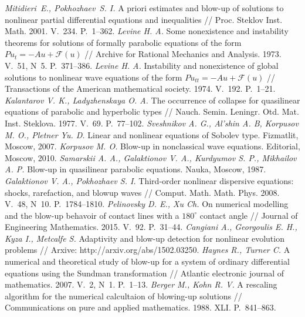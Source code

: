 \documentclass[twoside]{book}
\begin{document}
\begin{CJK*}{GBK}{song}


\begin{thebibliography}{s2}
      {\itshape Mitidieri~E., Pokhozhaev~S. I.} A priori estimates and blow-up of solutions to nonlinear partial differential equations and inequalities // Proc. Steklov Inst. Math. 2001. V.~234. P.~1--362.
     {\itshape Levine H. A.} Some nonexistence and instability theorems for solutions of formally parabolic equations of the form $Pu_t=-Au+\mathcal{F}(u)$ // Archive for Rational Mechanics and Analysis. 1973. V.~51, N~5. P.~371--386.
     {\itshape Levine H. A.}  Instability and nonexistence of global solutions to nonlinear wave equations of the form $Pu_{tt}=-Au+\mathcal{F}(u)$ // Transactions of the American mathematical society. 1974. V.~192. P.~1--21.
     {\itshape Kalantarov V. K., Ladyzhenskaya O. A.} The occurrence of collapse for quasilinear equations of parabolic and hyperbolic types // Nauch. Semin. Leningr. Otd. Mat. Inst. Steklova. 1977. V.~69. P.~77--102.
     {\itshape Sveshnikov A. G., Al’shin A. B, Korpusov M. O., Pletner Yu. D.}  Linear and nonlinear equations of Sobolev type.  Fizmatlit, Moscow, 2007.
     {\itshape Korpusov M. O.} Blow-up in nonclassical wave equations. Editorial, Moscow, 2010.
     {\itshape Samarskii A. A., Galaktionov V. A., Kurdyumov S. P., Mikhailov A. P.} Blow-up in quasilinear parabolic equations. Nauka, Moscow, 1987.
     {\itshape Galaktionov V. A., Pokhozhaev S. I.} Third-order nonlinear dispersive equations: shocks, rarefaction, and blowup waves // Comput. Math. Math. Phys. 2008. V.~48, N~10. P.~1784--1810.
     {\itshape Pelinovsky D. E., Xu Ch.} On numerical modelling and the blow-up behavoir of contact lines with a $180^\circ$ contact angle // Journal of Engineering Mathematics. 2015. V.~92. P.~31--44.
     {\itshape Cangiani A., Georgoulis E. H., Kyza I., Metcalfe S.} Adaptivity and blow-up detection for nonlinear evolution problems // Arxive: http://arxiv.org/abs/1502.03250.
     {\itshape Haynes R., Turner C.} A numerical and theoretical study of blow-up for a system of ordinary differential equations using the Sundman transformation // Atlantic electronic journal of mathematics. 2007. V.~2, N~1. P.~1--13.
     {\itshape Berger M., Kohn R. V.} A rescaling algorithm for the numerical calcultaion of blowing-up solutions // Communications on pure and applied mathematics. 1988. XLI. P.~841--863.

\end{thebibliography}
\end{CJK*}
\end{document}
